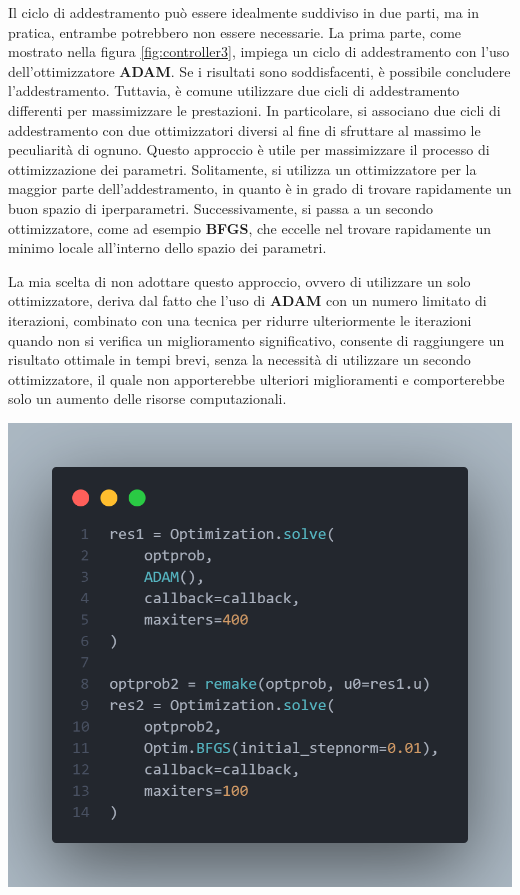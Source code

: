 Il ciclo di addestramento può essere idealmente suddiviso in due parti, 
ma in pratica, entrambe potrebbero non essere necessarie. 
La prima parte, come mostrato nella figura \ref{fig:controller3}, 
impiega un ciclo di addestramento con l'uso dell'ottimizzatore 
\textbf{ADAM}. Se i risultati sono soddisfacenti, è possibile 
concludere l'addestramento. Tuttavia, è comune utilizzare due cicli 
di addestramento differenti per massimizzare le prestazioni. 
In particolare, si associano due cicli di addestramento con due 
ottimizzatori diversi al fine di sfruttare al massimo le peculiarità 
di ognuno. Questo approccio è utile per massimizzare il processo di 
ottimizzazione dei parametri. Solitamente, si utilizza un 
ottimizzatore per la maggior parte dell'addestramento, in quanto 
è in grado di trovare rapidamente un buon spazio di iperparametri. 
Successivamente, si passa a un secondo ottimizzatore, come ad esempio 
\textbf{BFGS}, che eccelle nel trovare rapidamente un minimo locale 
all'interno dello spazio dei parametri.

La mia scelta di non adottare questo approccio, ovvero di utilizzare 
un solo ottimizzatore, deriva dal fatto che l'uso di \textbf{ADAM} 
con un numero limitato di iterazioni, combinato con una tecnica per 
ridurre ulteriormente le iterazioni quando non si verifica un 
miglioramento significativo, consente di raggiungere un risultato 
ottimale in tempi brevi, senza la necessità di utilizzare un secondo 
ottimizzatore, il quale non apporterebbe ulteriori miglioramenti e 
comporterebbe solo un aumento delle risorse computazionali.

\begin{minipage}{\linewidth}
	\centering
	\includegraphics[width=\textwidth]{img/optimizers_example.png}
	\label{fig:two_otpimizers}
\end{minipage}

